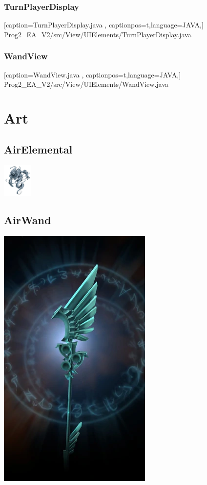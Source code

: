 \documentclass[a4paper,12pt]{scrartcl}
\begin{document}
	\subsubsection{TurnPlayerDisplay}
	
	[caption={TurnPlayerDisplay.java}
	\label{lst:javaclass},
	captionpos=t,language=JAVA,]
	{Prog2_EA_V2/src/View/UIElements/TurnPlayerDisplay.java}
	\subsubsection{WandView}
	
	[caption={WandView.java}
	\label{lst:javaclass},
	captionpos=t,language=JAVA,]
	{Prog2_EA_V2/src/View/UIElements/WandView.java}
	
	\section{Art}
	\subsection{AirElemental}
	\begin{center}\includegraphics{Prog2_EA_V2/Art/AirElemental.png}\end{center}
	\subsection{AirWand}
	\begin{center}\includegraphics{Prog2_EA_V2/Art/AirWand.png}\end{center}
\end{document}

